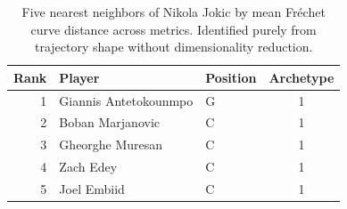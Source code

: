 \begin{table}[htbp]
  \centering\small
  \begin{tabular}{rllc}
    \toprule
    Rank & Player & Position & Archetype \\
    \midrule
    1 & Giannis Antetokounmpo & G & 1 \\
    2 & Boban Marjanovic & C & 1 \\
    3 & Gheorghe Muresan & C & 1 \\
    4 & Zach Edey & C & 1 \\
    5 & Joel Embiid & C & 1 \\
    \bottomrule
  \end{tabular}
  \caption{Five nearest neighbors of Nikola Jokic by mean Fr\'{e}chet curve distance across metrics. Identified purely from trajectory shape without dimensionality reduction.}
  \label{tab:Nikola_Jokic_frechet_curve_neighbors}
\end{table}


